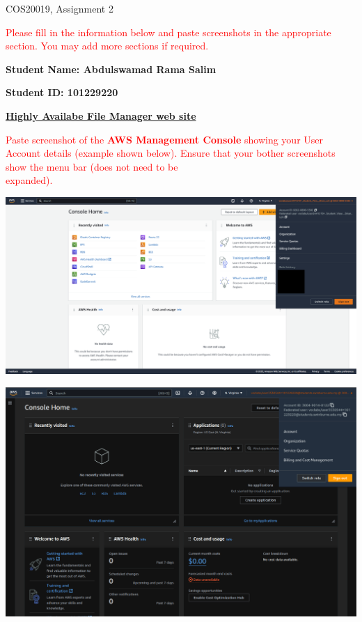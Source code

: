 \documentclass[11pt]{article}
\begin{document}
\noindent COS20019, Assignment 2

\vspace{0.8cm}

\noindent\textcolor{red}{Please fill in the information below and paste screenshots in the appropriate section. You may add more sections if required.}

\vspace{0.4cm}

\noindent\textbf{Student Name: Abdulswamad Rama Salim} 

\vspace{0.45cm}

\noindent\textbf{Student ID\@: 101229220}

\vspace{1.2cm}

\noindent\underline{\textbf{Highly Availabe File Manager web site}}

\vspace{0.6cm}

\noindent\textcolor{red}{Paste screenshot of the \textbf{AWS Management Console} showing your User Account details (example shown below). Ensure that your bother screenshots show the menu bar (does not need to be\\ expanded).}

\vspace{0.6cm}


{\centering
\includegraphics[width=6.2in]{pics/pic.png}}

{\centering
\includegraphics[width=6.2in]{pics/0.png}}
\end{document}
